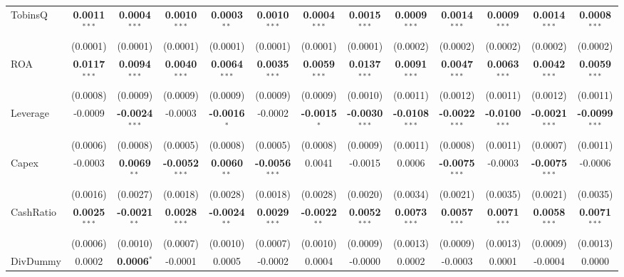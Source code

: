 \begin{landscape}
\begin{table}[H]
\begin{tabular}{lcccccccccccc}
TobinsQ & \textbf{0.0011}$^{***}$ & \textbf{0.0004}$^{***}$ & \textbf{0.0010}$^{***}$ & \textbf{0.0003}$^{**}$ & \textbf{0.0010}$^{***}$ & \textbf{0.0004}$^{***}$ & \textbf{0.0015}$^{***}$ & \textbf{0.0009}$^{***}$ & \textbf{0.0014}$^{***}$ & \textbf{0.0009}$^{***}$ & \textbf{0.0014}$^{***}$ & \textbf{0.0008}$^{***}$ \\
 & (0.0001) & (0.0001) & (0.0001) & (0.0001) & (0.0001) & (0.0001) & (0.0001) & (0.0002) & (0.0002) & (0.0002) & (0.0002) & (0.0002) \\
ROA & \textbf{0.0117}$^{***}$ & \textbf{0.0094}$^{***}$ & \textbf{0.0040}$^{***}$ & \textbf{0.0064}$^{***}$ & \textbf{0.0035}$^{***}$ & \textbf{0.0059}$^{***}$ & \textbf{0.0137}$^{***}$ & \textbf{0.0091}$^{***}$ & \textbf{0.0047}$^{***}$ & \textbf{0.0063}$^{***}$ & \textbf{0.0042}$^{***}$ & \textbf{0.0059}$^{***}$ \\
 & (0.0008) & (0.0009) & (0.0009) & (0.0009) & (0.0009) & (0.0009) & (0.0010) & (0.0011) & (0.0012) & (0.0011) & (0.0012) & (0.0011) \\
Leverage & -0.0009 & \textbf{-0.0024}$^{***}$ & -0.0003 & \textbf{-0.0016}$^{*}$ & -0.0002 & \textbf{-0.0015}$^{*}$ & \textbf{-0.0030}$^{***}$ & \textbf{-0.0108}$^{***}$ & \textbf{-0.0022}$^{***}$ & \textbf{-0.0100}$^{***}$ & \textbf{-0.0021}$^{***}$ & \textbf{-0.0099}$^{***}$ \\
 & (0.0006) & (0.0008) & (0.0005) & (0.0008) & (0.0005) & (0.0008) & (0.0009) & (0.0011) & (0.0008) & (0.0011) & (0.0007) & (0.0011) \\
Capex & -0.0003 & \textbf{0.0069}$^{**}$ & \textbf{-0.0052}$^{***}$ & \textbf{0.0060}$^{**}$ & \textbf{-0.0056}$^{***}$ & 0.0041 & -0.0015 & 0.0006 & \textbf{-0.0075}$^{***}$ & -0.0003 & \textbf{-0.0075}$^{***}$ & -0.0006 \\
 & (0.0016) & (0.0027) & (0.0018) & (0.0028) & (0.0018) & (0.0028) & (0.0020) & (0.0034) & (0.0021) & (0.0035) & (0.0021) & (0.0035) \\
CashRatio & \textbf{0.0025}$^{***}$ & \textbf{-0.0021}$^{**}$ & \textbf{0.0028}$^{***}$ & \textbf{-0.0024}$^{**}$ & \textbf{0.0029}$^{***}$ & \textbf{-0.0022}$^{**}$ & \textbf{0.0052}$^{***}$ & \textbf{0.0073}$^{***}$ & \textbf{0.0057}$^{***}$ & \textbf{0.0071}$^{***}$ & \textbf{0.0058}$^{***}$ & \textbf{0.0071}$^{***}$ \\
 & (0.0006) & (0.0010) & (0.0007) & (0.0010) & (0.0007) & (0.0010) & (0.0009) & (0.0013) & (0.0009) & (0.0013) & (0.0009) & (0.0013) \\
DivDummy & 0.0002 & \textbf{0.0006}$^{*}$ & -0.0001 & 0.0005 & -0.0002 & 0.0004 & -0.0000 & 0.0002 & -0.0003 & 0.0001 & -0.0004 & 0.0000 \\

\end{tabular}
\end{table}
\end{landscape}
